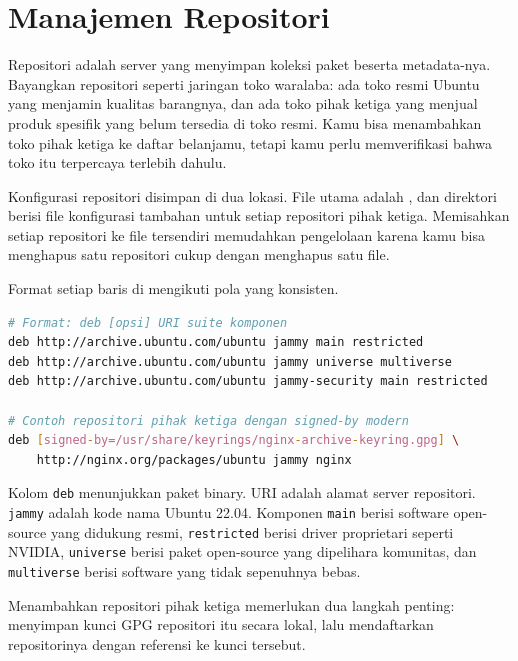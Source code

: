 \section{Manajemen Repositori}
\label{sec:repository-management}

Repositori adalah server yang menyimpan koleksi paket beserta metadata-nya.
Bayangkan repositori seperti jaringan toko waralaba: ada toko resmi Ubuntu yang
menjamin kualitas barangnya, dan ada toko pihak ketiga yang menjual produk
spesifik yang belum tersedia di toko resmi. Kamu bisa menambahkan toko pihak
ketiga ke daftar belanjamu, tetapi kamu perlu memverifikasi bahwa toko itu
terpercaya terlebih dahulu.

Konfigurasi repositori disimpan di dua lokasi. File utama adalah
, dan direktori 
berisi file konfigurasi tambahan untuk setiap repositori pihak ketiga. Memisahkan
setiap repositori ke file tersendiri memudahkan pengelolaan karena kamu bisa
menghapus satu repositori cukup dengan menghapus satu file.

Format setiap baris di  mengikuti pola yang konsisten.

\begin{lstlisting}[language=bash, caption={Format entri sources.list dan contohnya}]
# Format: deb [opsi] URI suite komponen
deb http://archive.ubuntu.com/ubuntu jammy main restricted
deb http://archive.ubuntu.com/ubuntu jammy universe multiverse
deb http://archive.ubuntu.com/ubuntu jammy-security main restricted

# Contoh repositori pihak ketiga dengan signed-by modern
deb [signed-by=/usr/share/keyrings/nginx-archive-keyring.gpg] \
    http://nginx.org/packages/ubuntu jammy nginx
\end{lstlisting}

Kolom \texttt{deb} menunjukkan paket binary. URI adalah alamat server repositori.
\texttt{jammy} adalah kode nama Ubuntu 22.04. Komponen \texttt{main} berisi
software open-source yang didukung resmi, \texttt{restricted} berisi driver
proprietari seperti NVIDIA, \texttt{universe} berisi paket open-source yang
dipelihara komunitas, dan \texttt{multiverse} berisi software yang tidak
sepenuhnya bebas.

Menambahkan repositori pihak ketiga memerlukan dua langkah penting: menyimpan
kunci GPG repositori itu secara lokal, lalu mendaftarkan repositorinya dengan
referensi ke kunci tersebut.

